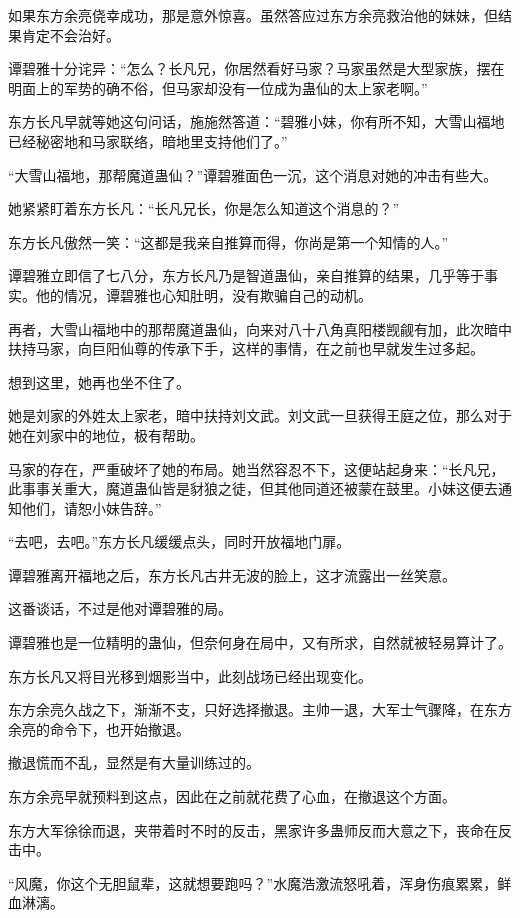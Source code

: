 \begin{this_body}
如果东方余亮侥幸成功，那是意外惊喜。虽然答应过东方余亮救治他的妹妹，但结果肯定不会治好。

谭碧雅十分诧异：“怎么？长凡兄，你居然看好马家？马家虽然是大型家族，摆在明面上的军势的确不俗，但马家却没有一位成为蛊仙的太上家老啊。”

东方长凡早就等她这句问话，施施然答道：“碧雅小妹，你有所不知，大雪山福地已经秘密地和马家联络，暗地里支持他们了。”

“大雪山福地，那帮魔道蛊仙？”谭碧雅面色一沉，这个消息对她的冲击有些大。

她紧紧盯着东方长凡：“长凡兄长，你是怎么知道这个消息的？”

东方长凡傲然一笑：“这都是我亲自推算而得，你尚是第一个知情的人。”

谭碧雅立即信了七八分，东方长凡乃是智道蛊仙，亲自推算的结果，几乎等于事实。他的情况，谭碧雅也心知肚明，没有欺骗自己的动机。

再者，大雪山福地中的那帮魔道蛊仙，向来对八十八角真阳楼觊觎有加，此次暗中扶持马家，向巨阳仙尊的传承下手，这样的事情，在之前也早就发生过多起。

想到这里，她再也坐不住了。

她是刘家的外姓太上家老，暗中扶持刘文武。刘文武一旦获得王庭之位，那么对于她在刘家中的地位，极有帮助。

马家的存在，严重破坏了她的布局。她当然容忍不下，这便站起身来：“长凡兄，此事事关重大，魔道蛊仙皆是豺狼之徒，但其他同道还被蒙在鼓里。小妹这便去通知他们，请恕小妹告辞。”

“去吧，去吧。”东方长凡缓缓点头，同时开放福地门扉。

谭碧雅离开福地之后，东方长凡古井无波的脸上，这才流露出一丝笑意。

这番谈话，不过是他对谭碧雅的局。

谭碧雅也是一位精明的蛊仙，但奈何身在局中，又有所求，自然就被轻易算计了。

东方长凡又将目光移到烟影当中，此刻战场已经出现变化。

东方余亮久战之下，渐渐不支，只好选择撤退。主帅一退，大军士气骤降，在东方余亮的命令下，也开始撤退。

撤退慌而不乱，显然是有大量训练过的。

东方余亮早就预料到这点，因此在之前就花费了心血，在撤退这个方面。

东方大军徐徐而退，夹带着时不时的反击，黑家许多蛊师反而大意之下，丧命在反击中。

“风魔，你这个无胆鼠辈，这就想要跑吗？”水魔浩激流怒吼着，浑身伤痕累累，鲜血淋漓。


\end{this_body}
